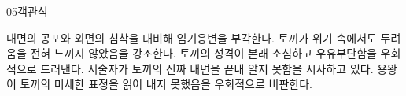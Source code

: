 \documentclass[fs85,seriesWit]{korfarm-base}
\begin{document}
\begin{kfQBlock}{05}{객관식}
\begin{kfChoices}
\kfChoice 내면의 공포와 외면의 침착을 대비해 임기응변을 부각한다.
\kfChoice 토끼가 위기 속에서도 두려움을 전혀 느끼지 않았음을 강조한다.
\kfChoice 토끼의 성격이 본래 소심하고 우유부단함을 우회적으로 드러낸다.
\kfChoice 서술자가 토끼의 진짜 내면을 끝내 알지 못함을 시사하고 있다.
\kfChoice 용왕이 토끼의 미세한 표정을 읽어 내지 못했음을 우회적으로 비판한다.
\end{kfChoices}
\end{kfQBlock}

\kfEndMC

\end{document}
